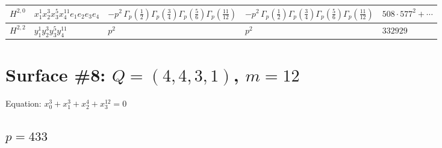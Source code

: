 \documentclass[11pt]{article}
\begin{document}
\begin{table}[ht]
{\begin{tabular}{@{}lllll@{}}
\midrule
$H^{2,0}$ & $x_{1}^{1} x_{2}^{3} x_{3}^{5} x_{4}^{11}  e_{1} e_{2} e_{3} e_{4}$ & $- p^{2} \, \Gamma_p \left( \frac{1}{2} \right) \Gamma_p \left( \frac{3}{4} \right) \Gamma_p \left( \frac{5}{6} \right) \Gamma_p \left( \frac{11}{12} \right)$ & $- p^{2} \, \Gamma_p \left( \frac{1}{2} \right) \Gamma_p \left( \frac{3}{4} \right) \Gamma_p \left( \frac{5}{6} \right) \Gamma_p \left( \frac{11}{12} \right)$ & $508{\cdot}577^{2}{+}\cdots$ \\
\midrule
$H^{2,2}$ & $y_{1}^{1} y_{2}^{3} y_{3}^{5} y_{4}^{11}$ & $p^{2} \,$ & $p^{2} \,$ & $332929$ \\
\bottomrule
\end{tabular}
}
\renewcommand{\arraystretch}{1.0}
\end{table}

\newpage

\section*{Surface \#8: $Q=(4, 4, 3, 1)$, $m=12$}

Equation: $x_0^{3} + x_1^{3} + x_2^{4} + x_3^{12} = 0$

\subsection*{$p = 433$}
\end{document}
